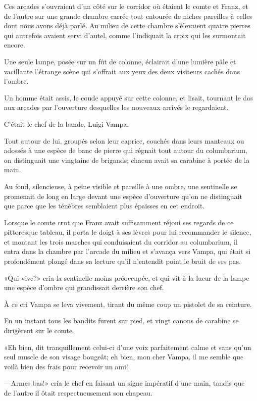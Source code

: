 Ces arcades s'ouvraient d'un côté sur le corridor où étaient le comte et Franz, et de l'autre sur une grande chambre carrée tout entourée de niches pareilles à celles dont nous avons déjà parlé. Au milieu de cette chambre s'élevaient quatre pierres qui autrefois avaient servi d'autel, comme l'indiquait la croix qui les surmontait encore. 

Une seule lampe, posée sur un fût de colonne, éclairait d'une lumière pâle et vacillante l'étrange scène qui s'offrait aux yeux des deux visiteurs cachés dans l'ombre. 

Un homme était assis, le coude appuyé sur cette colonne, et lisait, tournant le dos aux arcades par l'ouverture desquelles les nouveaux arrivés le regardaient. 

C'était le chef de la bande, Luigi Vampa.  

Tout autour de lui, groupés selon leur caprice, couchés dans leurs manteaux ou adossés à une espèce de banc de pierre qui régnait tout autour du columbarium, on distinguait une vingtaine de brigands; chacun avait sa carabine à portée de la main. 

Au fond, silencieuse, à peine visible et pareille à une ombre, une sentinelle se promenait de long en large devant une espèce d'ouverture qu'on ne distinguait que parce que les ténèbres semblaient plus épaisses en cet endroit. 

Lorsque le comte crut que Franz avait suffisamment réjoui ses regards de ce pittoresque tableau, il porta le doigt à ses lèvres pour lui recommander le silence, et montant les trois marches qui conduisaient du corridor au columbarium, il entra dans la chambre par l'arcade du milieu et s'avança vers Vampa, qui était si profondément plongé dans sa lecture qu'il n'entendit point le bruit de ses pas. 

«Qui vive?» cria la sentinelle moins préoccupée, et qui vit à la lueur de la lampe une espèce d'ombre qui grandissait derrière son chef. 

À ce cri Vampa se leva vivement, tirant du même coup un pistolet de sa ceinture. 

En un instant tous les bandits furent sur pied, et vingt canons de carabine se dirigèrent sur le comte. 

«Eh bien, dit tranquillement celui-ci d'une voix parfaitement calme et sans qu'un seul muscle de son visage bougeât; eh bien, mon cher Vampa, il me semble que voilà bien des frais pour recevoir un ami! 

—Armes bas!» cria le chef en faisant un signe impératif d'une main, tandis que de l'autre il ôtait respectueusement son chapeau. 

